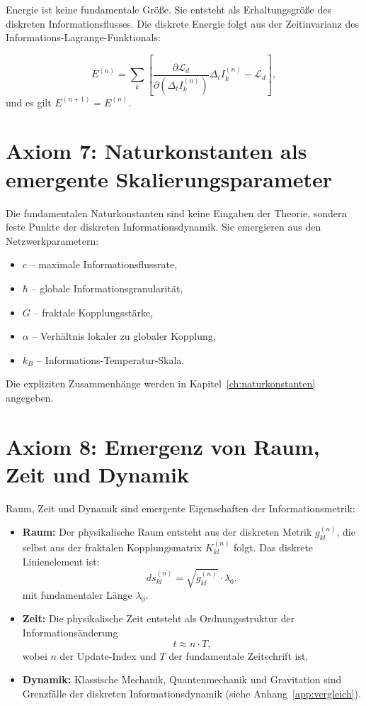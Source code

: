 Energie ist keine fundamentale Größe. Sie entsteht als Erhaltungsgröße des diskreten Informationsflusses. Die diskrete Energie folgt aus der Zeitinvarianz des Informations-Lagrange-Funktionals:

\[
E^{(n)} = \sum_k \left[ \frac{\partial \mathcal{L}_d}{\partial (\Delta_t I_k^{(n)})} \Delta_t I_k^{(n)} - \mathcal{L}_d \right],
\]
und es gilt \( E^{(n+1)} = E^{(n)} \).

\section{Axiom 7: Naturkonstanten als emergente Skalierungsparameter}
\label{sec:axiom7}

Die fundamentalen Naturkonstanten sind keine Eingaben der Theorie, sondern feste Punkte der diskreten Informationsdynamik. Sie emergieren aus den Netzwerkparametern:

\begin{itemize}
    \item \( c \) – maximale Informationsflussrate,
    \item \( \hbar \) – globale Informationsgranularität,
    \item \( G \) – fraktale Kopplungsstärke,
    \item \( \alpha \) – Verhältnis lokaler zu globaler Kopplung,
    \item \( k_B \) – Informations-Temperatur-Skala.
\end{itemize}

Die expliziten Zusammenhänge werden in Kapitel~\ref{ch:naturkonstanten} angegeben.

\section{Axiom 8: Emergenz von Raum, Zeit und Dynamik}
\label{sec:axiom8}

Raum, Zeit und Dynamik sind emergente Eigenschaften der Informationsmetrik:

\begin{itemize}
    \item \textbf{Raum:} Der physikalische Raum entsteht aus der diskreten Metrik \( g_{kl}^{(n)} \), die selbst aus der fraktalen Kopplungsmatrix \( K_{kl}^{(n)} \) folgt. Das diskrete Linienelement ist:
    \[
    ds_{kl}^{(n)} = \sqrt{g_{kl}^{(n)}} \cdot \lambda_0,
    \]
    mit fundamentaler Länge \( \lambda_0 \).

    \item \textbf{Zeit:} Die physikalische Zeit entsteht als Ordnungsstruktur der Informationsänderung  
    \[
    t \approx n \cdot T,
    \]
    wobei \( n \) der Update-Index und \( T \) der fundamentale Zeitschrift ist.

    \item \textbf{Dynamik:} Klassische Mechanik, Quantenmechanik und Gravitation sind Grenzfälle der diskreten Informationsdynamik (siehe Anhang~\ref{app:vergleich}).
\end{itemize}

